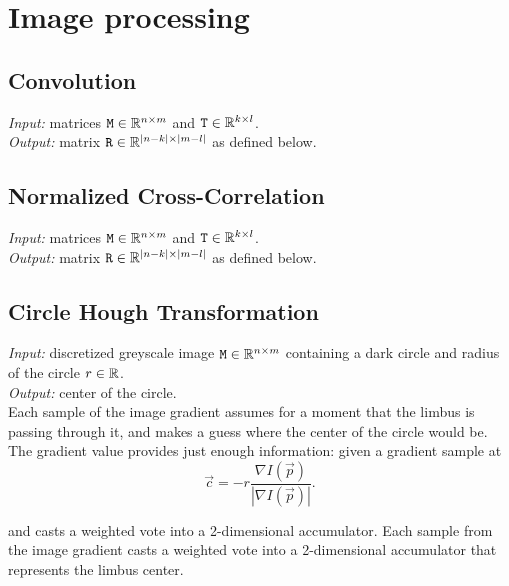 \section{Image processing}


\subsection{Convolution}

\textit{Input:} matrices $\mathtt{M} \in \mathbb{R}^{n \times m}$ and $\mathtt{T} \in \mathbb{R}^{k \times l}$.\\
\textit{Output:} matrix $\mathtt{R} \in \mathbb{R}^{|n-k| \times |m - l|}$ as defined below.\\

\subsection{Normalized Cross-Correlation}

\textit{Input:} matrices $\mathtt{M} \in \mathbb{R}^{n \times m}$ and $\mathtt{T} \in \mathbb{R}^{k \times l}$.\\
\textit{Output:} matrix $\mathtt{R} \in \mathbb{R}^{|n-k| \times |m - l|}$ as defined below.\\


\subsection{Circle Hough Transformation}

\textit{Input:} discretized greyscale image $\mathtt{M} \in \mathbb{R}^{n \times m}$ containing a dark circle and radius of the circle $r \in \mathbb{R}$.\\
\textit{Output:} center of the circle.\\

Each sample of the image gradient assumes for a moment that the limbus is passing through it, and makes a guess where the center of the circle would be.
The gradient value provides just enough information: given a gradient sample at 
$$\vec c = -r \frac {\nabla I(\vec p)} {|\nabla I(\vec p)|}.$$

and casts a weighted vote into a 2-dimensional accumulator.
Each sample from the image gradient casts a weighted vote into a 2-dimensional accumulator that represents the limbus center.

